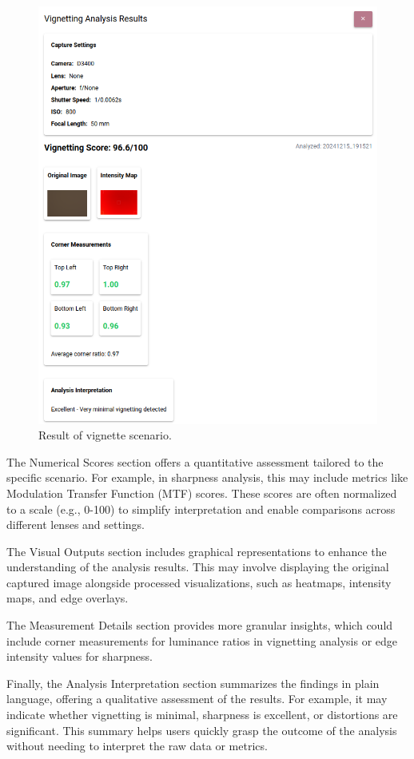 \begin{figure}[hbt]
\centering
\includegraphics[height=0.8\textwidth]{Images/scenario_result.png}
\caption{Result of vignette scenario.}
\label{fig:ui_scenario_result}
\end{figure}

The Numerical Scores section offers a quantitative assessment tailored to the specific scenario. For example, in sharpness analysis, this may include metrics like Modulation Transfer Function (MTF) scores. These scores are often normalized to a scale (e.g., 0-100) to simplify interpretation and enable comparisons across different lenses and settings.

The Visual Outputs section includes graphical representations to enhance the understanding of the analysis results. This may involve displaying the original captured image alongside processed visualizations, such as heatmaps, intensity maps, and edge overlays.

The Measurement Details section provides more granular insights, which could include corner measurements for luminance ratios in vignetting analysis or edge intensity values for sharpness.

Finally, the Analysis Interpretation section summarizes the findings in plain language, offering a qualitative assessment of the results. For example, it may indicate whether vignetting is minimal, sharpness is excellent, or distortions are significant. This summary helps users quickly grasp the outcome of the analysis without needing to interpret the raw data or metrics.

